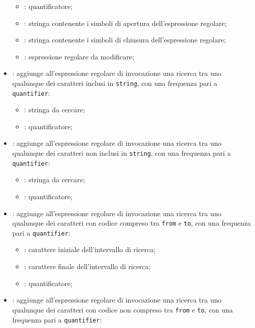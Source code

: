 \begin{itemize}
\begin{itemize}
		\item {}: quantificatore;
		\item {}: stringa contenente i simboli di apertura dell'espressione regolare;
		\item {}: stringa contenente i simboli di chiusura dell'espressione regolare;
		\item {}: espressione regolare da modificare;
	\end{itemize}
	\item {}: aggiunge all'espressione regolare di invocazione una ricerca tra uno qualunque dei caratteri inclusi in \texttt{string}, con una frequenza pari a \texttt{quantifier}:
	\begin{itemize}
		\item {}: stringa da cercare;
		\item {}: quantificatore;
	\end{itemize}
	\item {}: aggiunge all'espressione regolare di invocazione una ricerca tra uno qualunque dei caratteri non inclusi in \texttt{string}, con una frequenza pari a \texttt{quantifier}:
	\begin{itemize}
		\item {}: stringa da cercare;
		\item {}: quantificatore;
	\end{itemize}
	\item {}: aggiunge all'espressione regolare di invocazione una ricerca tra uno qualunque dei caratteri con codice compreso tra \texttt{from} e \texttt{to}, con una frequenza pari a \texttt{quantifier}:
	\begin{itemize}
		\item {}: carattere iniziale dell'intervallo di ricerca;
		\item {}: carattere finale dell'intervallo di ricerca;
		\item {}: quantificatore;
	\end{itemize}
	\item {}: aggiunge all'espressione regolare di invocazione una ricerca tra uno qualunque dei caratteri con codice non compreso tra \texttt{from} e \texttt{to}, con una frequenza pari a \texttt{quantifier}:

\end{itemize}
